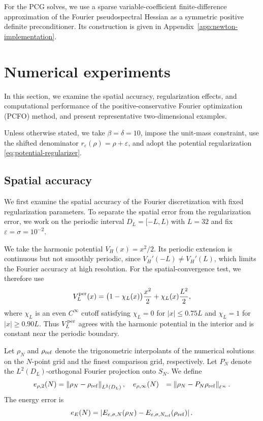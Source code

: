 \documentclass[11pt]{article}
\newcommand{\SN}{S_N}
\newcommand{\eps}{\varepsilon}
\newcommand{\sig}{\sigma}
\newcommand{\norm}[1]{\left\|#1\right\|}
\newcommand{\abs}[1]{\left|#1\right|}
\theoremstyle{plain}
\theoremstyle{definition}
\numberwithin{equation}{section}
\begin{document}
For the PCG solves, we use a sparse variable-coefficient
finite-difference approximation of the Fourier pseudospectral
Hessian as a symmetric positive definite preconditioner. Its
construction is given in
Appendix~\ref{app:newton-implementation}.


\section{Numerical experiments}
\label{sec:num}

In this section, we examine the spatial accuracy, regularization
effects, and computational performance of the positive-conservative
Fourier optimization (PCFO) method, and present representative
two-dimensional examples.

Unless otherwise stated, we take $\beta=\delta=10$, impose the
unit-mass constraint, use the shifted denominator
$r_\eps(\rho)=\rho+\eps$, and adopt the potential regularization
\eqref{eq:potential-regularizer}.
\subsection{Spatial accuracy}
\label{subsec:num-mesh}

We first examine the spatial accuracy of the Fourier discretization
with fixed regularization parameters. 
To separate the spatial error from
the regularization error, we work on the periodic interval
$D_L=[-L,L)$ with $L=32$ and fix
$\eps=\sig=10^{-2}$. 

We take the harmonic potential $V_H(x)=x^2/2$. Its periodic extension
is continuous but not smoothly periodic, since
$V_H'(-L)\ne V_H'(L)$, which limits the Fourier accuracy at high
resolution. For the spatial-convergence test, we therefore use
\begin{equation}
\label{eq:periodic-harmonic}
V_L^{\rm per}(x)
=
\bigl(1-\chi_L(x)\bigr)\frac{x^2}{2}
+
\chi_L(x)\frac{L^2}{2},
\end{equation}
where $\chi_L$ is an even $C^\infty$ cutoff satisfying
$\chi_L=0$ for $|x|\le0.75L$ and $\chi_L=1$ for $|x|\ge0.90L$.
Thus $V_L^{\rm per}$ agrees with the harmonic potential in the
interior and is constant near the periodic boundary.

Let $\rho_N$ and $\rho_{\rm ref}$ denote the trigonometric
interpolants of the numerical solutions on the $N$-point grid and
the finest comparison grid, respectively. Let $P_N$ denote the
$L^2(D_L)$-orthogonal Fourier projection onto $\SN$. We define
\begin{equation}
\label{eq:spatial-errors}
\begin{aligned}
e_{\rho,2}(N)
&=
\norm{\rho_N-\rho_{\rm ref}}_{L^2(D_L)},\quad
e_{\rho,\infty}(N)
&=
\norm{\rho_N-P_N\rho_{\rm ref}}_{\ell^\infty}.
\end{aligned}
\end{equation}
The energy error is
\begin{equation}
\label{eq:spatial-energy-error}
e_E(N)
=
\abs{
E_{\eps,\sig,N}(\rho_N)
-
E_{\eps,\sig,N_{\rm ref}}(\rho_{\rm ref})
}.
\end{equation}
\end{document}
